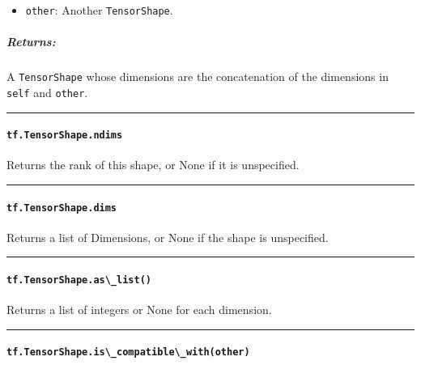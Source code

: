 \begin{itemize}
\tightlist
\item
  \lstinline{other}: Another \lstinline{TensorShape}.
\end{itemize}

\subparagraph{Returns: }\label{returns-32}

A \lstinline{TensorShape} whose dimensions are the concatenation of the
dimensions in \lstinline{self} and \lstinline{other}.

\begin{center}\rule{0.5\linewidth}{\linethickness}\end{center}

\paragraph{\texorpdfstring{\lstinline{tf.TensorShape.ndims}
}{tf.TensorShape.ndims }}\label{tf.tensorshape.ndims}

Returns the rank of this shape, or None if it is unspecified.

\begin{center}\rule{0.5\linewidth}{\linethickness}\end{center}

\paragraph{\texorpdfstring{\lstinline{tf.TensorShape.dims}
}{tf.TensorShape.dims }}\label{tf.tensorshape.dims}

Returns a list of Dimensions, or None if the shape is unspecified.

\begin{center}\rule{0.5\linewidth}{\linethickness}\end{center}

\paragraph{\texorpdfstring{\lstinline{tf.TensorShape.as\_list()}
}{tf.TensorShape.as\_list() }}\label{tf.tensorshape.asux5flist}

Returns a list of integers or None for each dimension.

\begin{center}\rule{0.5\linewidth}{\linethickness}\end{center}

\paragraph{\texorpdfstring{\lstinline{tf.TensorShape.is\_compatible\_with(other)}
}{tf.TensorShape.is\_compatible\_with(other) }}\label{tf.tensorshape.isux5fcompatibleux5fwithother}

